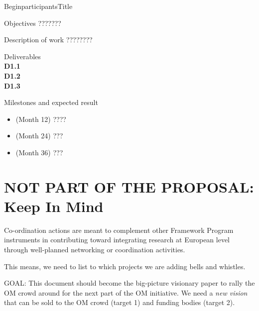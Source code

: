 \documentclass{euproposal}
\begin{document}
\begin{workpackage}{36}{1}{Begin}{participants}{Title}
\begin{wpbox}{Objectives}
???????
\end{wpbox}
\begin{wpbox}{Description of work}
  ????????
\end{wpbox}
\begin{wpbox}{Deliverables\\}
{\bf D1.1} \\
{\bf D1.2} \\
{\bf D1.3} 
\end{wpbox}
\begin{wpbox}{Milestones and expected result}
\begin{itemize}
\item (Month 12) ????
\item (Month 24) ???
\item (Month 36) ???
\end{itemize}
\end{wpbox}
\end{workpackage}
\newpage


\newpage

\section{NOT PART OF THE PROPOSAL:  Keep In Mind}
Co-ordination actions are meant to complement other Framework Program
instruments in contributing toward integrating research at European
level through well-planned networking or coordination activities.

This means, we need to list to which projects we are adding bells and
whistles.

GOAL: This document should become the big-picture visionary paper to
rally the OM crowd around for the next part of the OM initiative.  We
need a \emph{new vision} that can be sold to the OM crowd (target 1)
and funding bodies (target 2).
\end{document}
